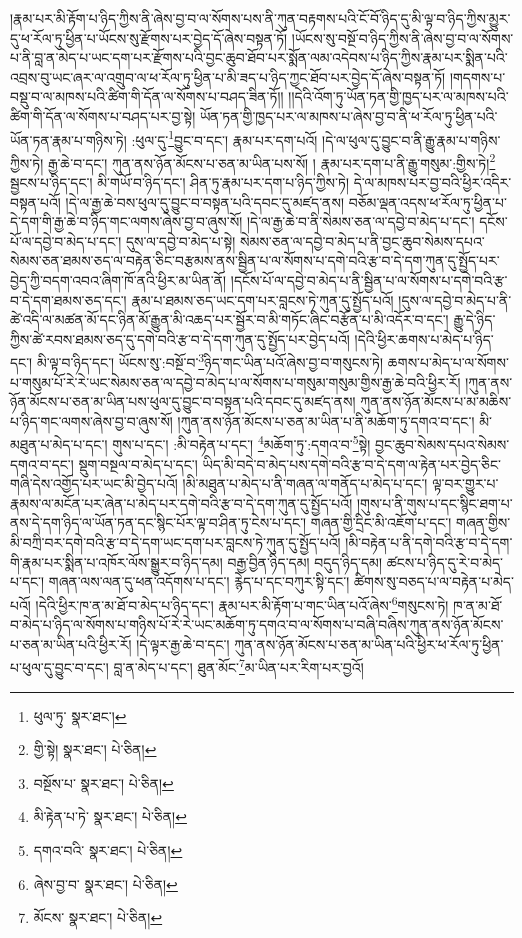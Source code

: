 །རྣམ་པར་མི་རྟོག་པ་ཉིད་ཀྱིས་ནི་ཞེས་བྱ་བ་ལ་སོགས་པས་ནི་ཀུན་བརྟགས་པའི་ངོ་བོ་ཉིད་དུ་མི་ལྟ་བ་ཉིད་ཀྱིས་མྱུར་དུ་ཕ་རོལ་ཏུ་ཕྱིན་པ་ཡོངས་སུ་རྫོགས་པར་བྱེད་དོ་ཞེས་བསྟན་ཏོ། །ཡོངས་སུ་བསྔོ་བ་ཉིད་ཀྱིས་ནི་ཞེས་བྱ་བ་ལ་སོགས་པ་ནི་བླ་ན་མེད་པ་ཡང་དག་པར་རྫོགས་པའི་བྱང་ཆུབ་ཐོབ་པར་སྨོན་ལམ་འདེབས་པ་ཉིད་ཀྱིས་རྣམ་པར་སྨིན་པའི་འབྲས་བུ་ཡང་ཞར་ལ་འགྲུབ་ལ་ཕ་རོལ་ཏུ་ཕྱིན་པ་མི་ཟད་པ་ཉིད་ཀྱང་ཐོབ་པར་བྱེད་དོ་ཞེས་བསྟན་ཏོ། །གདགས་པ་བསྡུ་བ་ལ་མཁས་པའི་ཚིག་གི་དོན་ལ་སོགས་པ་བཤད་ཟིན་ཏོ།། །།དེའི་འོག་ཏུ་ཡོན་ཏན་གྱི་ཁྱད་པར་ལ་མཁས་པའི་ཚིག་གི་དོན་ལ་སོགས་པ་བཤད་པར་བྱ་སྟེ། ཡོན་ཏན་གྱི་ཁྱད་པར་ལ་མཁས་པ་ཞེས་བྱ་བ་ནི་ཕ་རོལ་ཏུ་ཕྱིན་པའི་ཡོན་ཏན་རྣམ་པ་གཉིས་ཏེ། :ཕུལ་དུ་\footnote{ཕུལ་ཏུ་  སྣར་ཐང་། }བྱུང་བ་དང་། རྣམ་པར་དག་པའོ། །དེ་ལ་ཕུལ་དུ་བྱུང་བ་ནི་རྒྱུ་རྣམ་པ་གཉིས་ཀྱིས་ཏེ། རྒྱ་ཆེ་བ་དང་། ཀུན་ནས་ཉོན་མོངས་པ་ཅན་མ་ཡིན་པས་སོ། །
རྣམ་པར་དག་པ་ནི་རྒྱུ་གསུམ་:གྱིས་ཏེ།\footnote{གྱི་སྟེ།  སྣར་ཐང་།  པེ་ཅིན། } སྦྱངས་པ་ཉིད་དང་། མི་གཡོ་བ་ཉིད་དང་། ཤིན་ཏུ་རྣམ་པར་དག་པ་ཉིད་ཀྱིས་ཏེ། དེ་ལ་མཁས་པར་བྱ་བའི་ཕྱིར་འདིར་བསྟན་པའོ། །དེ་ལ་རྒྱ་ཆེ་བས་ཕུལ་དུ་བྱུང་བ་བསྟན་པའི་དབང་དུ་མཛད་ནས། བཅོམ་ལྡན་འདས་ཕ་རོལ་ཏུ་ཕྱིན་པ་དེ་དག་གི་རྒྱ་ཆེ་བ་ཉིད་གང་ལགས་ཞེས་བྱ་བ་ཞུས་སོ། །དེ་ལ་རྒྱ་ཆེ་བ་ནི་སེམས་ཅན་ལ་དབྱེ་བ་མེད་པ་དང་། དངོས་པོ་ལ་དབྱེ་བ་མེད་པ་དང་། དུས་ལ་དབྱེ་བ་མེད་པ་སྟེ། སེམས་ཅན་ལ་དབྱེ་བ་མེད་པ་ནི་བྱང་ཆུབ་སེམས་དཔའ་སེམས་ཅན་ཐམས་ཅད་ལ་བརྟེན་ཅིང་བརྩམས་ནས་སྦྱིན་པ་ལ་སོགས་པ་དགེ་བའི་རྩ་བ་དེ་དག་ཀུན་དུ་སྤྱོད་པར་བྱེད་ཀྱི་བདག་འབའ་ཞིག་ཁོ་ནའི་ཕྱིར་མ་ཡིན་ནོ། །དངོས་པོ་ལ་དབྱེ་བ་མེད་པ་ནི་སྦྱིན་པ་ལ་སོགས་པ་དགེ་བའི་རྩ་བ་དེ་དག་ཐམས་ཅད་དང་། རྣམ་པ་ཐམས་ཅད་ཡང་དག་པར་བླངས་ཏེ་ཀུན་དུ་སྤྱོད་པའོ། །དུས་ལ་དབྱེ་བ་མེད་པ་ནི་ཚེ་འདི་ལ་མཚན་མོ་དང་ཉིན་མོ་རྒྱུན་མི་འཆད་པར་སྦྱོར་བ་མི་གཏོང་ཞིང་བརྩོན་པ་མི་འདོར་བ་དང་། རྒྱུ་དེ་ཉིད་ཀྱིས་ཚེ་རབས་ཐམས་ཅད་དུ་དགེ་བའི་རྩ་བ་དེ་དག་ཀུན་དུ་སྤྱོད་པར་བྱེད་པའོ། །དེའི་ཕྱིར་ཆགས་པ་མེད་པ་ཉིད་དང་། མི་ལྟ་བ་ཉིད་དང་། ཡོངས་སུ་:བསྔོ་བ་\footnote{བསྔོས་པ་  སྣར་ཐང་།  པེ་ཅིན། }ཉིད་གང་ཡིན་པའོ་ཞེས་བྱ་བ་གསུངས་ཏེ། ཆགས་པ་མེད་པ་ལ་སོགས་པ་གསུམ་པོ་རེ་རེ་ཡང་སེམས་ཅན་ལ་དབྱེ་བ་མེད་པ་ལ་སོགས་པ་གསུམ་གསུམ་གྱིས་རྒྱ་ཆེ་བའི་ཕྱིར་རོ། །ཀུན་ནས་ཉོན་མོངས་པ་ཅན་མ་ཡིན་པས་ཕུལ་དུ་བྱུང་བ་བསྟན་པའི་དབང་དུ་མཛད་ནས། ཀུན་ནས་ཉོན་མོངས་པ་མ་མཆིས་པ་ཉིད་གང་ལགས་ཞེས་བྱ་བ་ཞུས་སོ། །ཀུན་ནས་ཉོན་མོངས་པ་ཅན་མ་ཡིན་པ་ནི་མཆོག་ཏུ་དགའ་བ་དང་། མི་མཐུན་པ་མེད་པ་དང་། གུས་པ་དང་། :མི་བརྟེན་པ་དང་། \footnote{མི་རྟེན་པ་ཏེ་  སྣར་ཐང་།  པེ་ཅིན། }མཆོག་ཏུ་:དགའ་བ་\footnote{དགའ་བའི་  སྣར་ཐང་།  པེ་ཅིན། }སྟེ། བྱང་ཆུབ་སེམས་དཔའ་སེམས་དགའ་བ་དང་། སྡུག་བསྔལ་བ་མེད་པ་དང་། ཡིད་མི་བདེ་བ་མེད་པས་དགེ་བའི་རྩ་བ་དེ་དག་ལ་རྟེན་པར་བྱེད་ཅིང་གཞི་དེས་འགྱོད་པར་ཡང་མི་བྱེད་པའོ། །མི་མཐུན་པ་མེད་པ་ནི་གཞན་ལ་གནོད་པ་མེད་པ་དང་། ལྟ་བར་གྱུར་པ་རྣམས་ལ་མངོན་པར་ཞེན་པ་མེད་པར་དགེ་བའི་རྩ་བ་དེ་དག་ཀུན་དུ་སྤྱོད་པའོ། །གུས་པ་ནི་གུས་པ་དང་སྙིང་ཐག་པ་ནས་དེ་དག་ཉིད་ལ་ཡོན་ཏན་དང་སྙིང་པོར་ལྟ་བ་ཤིན་ཏུ་ངེས་པ་དང་། གཞན་གྱི་དྲིང་མི་འཇོག་པ་དང་། གཞན་གྱིས་མི་བཀྲི་བར་དགེ་བའི་རྩ་བ་དེ་དག་ཡང་དག་པར་བླངས་ཏེ་ཀུན་དུ་སྤྱོད་པའོ། །མི་བརྟེན་པ་ནི་དགེ་བའི་རྩ་བ་དེ་དག་གི་རྣམ་པར་སྨིན་པ་འཁོར་ལོས་སྒྱུར་བ་ཉིད་དམ། བརྒྱ་བྱིན་ཉིད་དམ། བདུད་ཉིད་དམ། ཚངས་པ་ཉིད་དུ་རེ་བ་མེད་པ་དང་། གཞན་ལས་ལན་དུ་ཕན་འདོགས་པ་དང་། རྙེད་པ་དང་བཀུར་སྟི་དང་། ཚིགས་སུ་བཅད་པ་ལ་བརྟེན་པ་མེད་པའོ། །དེའི་ཕྱིར་ཁ་ན་མ་ཐོ་བ་མེད་པ་ཉིད་དང་། རྣམ་པར་མི་རྟོག་པ་གང་ཡིན་པའོ་ཞེས་\footnote{ཞེས་བྱ་བ་  སྣར་ཐང་།  པེ་ཅིན། }གསུངས་ཏེ། ཁ་ན་མ་ཐོ་བ་མེད་པ་ཉིད་ལ་སོགས་པ་གཉིས་པོ་རེ་རེ་ཡང་མཆོག་ཏུ་དགའ་བ་ལ་སོགས་པ་བཞི་བཞིས་ཀུན་ནས་ཉོན་མོངས་པ་ཅན་མ་ཡིན་པའི་ཕྱིར་རོ། །དེ་ལྟར་རྒྱ་ཆེ་བ་དང་། ཀུན་ནས་ཉོན་མོངས་པ་ཅན་མ་ཡིན་པའི་ཕྱིར་ཕ་རོལ་ཏུ་ཕྱིན་པ་ཕུལ་དུ་བྱུང་བ་དང་། བླ་ན་མེད་པ་དང་། ཐུན་མོང་\footnote{མོངས་  སྣར་ཐང་།  པེ་ཅིན། }མ་ཡིན་པར་རིག་པར་བྱའོ། 